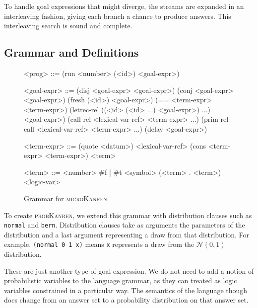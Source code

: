 \documentclass[
]{ceurart}
\begin{document}
To handle goal expressions that might diverge, the streams are
expanded in an interleaving\cite{kiselyov2005backtracking} fashion,
giving each branch a chance to produce answers. This interleaving search
is sound and complete\cite{rozplokhas2019certified}.

\subsection{Grammar and Definitions}

\begin{figure}
  \centering
  \begin{grammar}
<prog> ::= (run <number> (<id>) <goal-expr>)

<goal-expr> ::= (disj <goal-expr> <goal-expr>) \alt
	        (conj <goal-expr> <goal-expr>) \alt
                (fresh (<id>) <goal-expr>) \alt
		(== <term-expr> <term-expr>) \alt
		(letrec-rel ((<id> (<id> ...) <goal-expr>) ...) \\
		\hspace{\grammarindent} <goal-expr>) \alt
		(call-rel <lexical-var-ref> <term-expr> ...) \alt
		(prim-rel-call <lexical-var-ref> <term-expr> ...) \alt
		(delay <goal-expr>)

<term-expr> ::= (quote <datum>) \alt
                <lexical-var-ref> \alt
                (cons <term-expr> <term-expr>) \alt
                <term>

<term> ::= <number> \alt
           \#f | \#t \alt
	   <symbol> \alt
	   (<term> . <term>) \alt
	   <logic-var>

  \end{grammar}
  \caption{Grammar for \textsc{microKanren}}
  \label{fig:grammar}
\end{figure}

To create \textsc{probKanren}, we extend this grammar with distribution
clauses such as \texttt{normal} and \texttt{bern}. Distribution clauses
take as arguments the parameters of the distribution and a last argument
representing a draw from that distribution. For example, \texttt{(normal 0 1 x)}
means \texttt{x} represents a draw from the $\mathcal{N}(0,1)$ distribution.

These are just another type of goal expression. We do not need to add
a notion of probabilistic variables to the language grammar, as they
can treated as logic variables constrained in a particular way. The
semantics of the language though does change from an answer set to a
probability distribution on that answer set.
\end{document}
